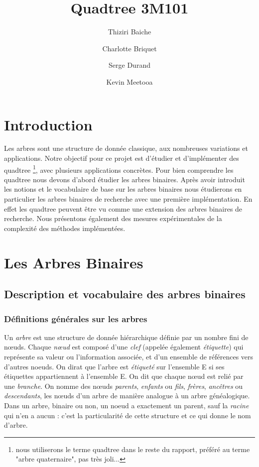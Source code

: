 \documentclass{report}
\title{Quadtree 3M101}
\author{Thiziri Baiche \and Charlotte Briquet \and Serge Durand \and Kevin Meetooa}
\begin{document}
\maketitle
\tableofcontents
\chapter*{Introduction}
Les arbres sont une structure de donnée classique, aux nombreuses variations et applications. Notre objectif pour ce projet est d'étudier et d'implémenter des quadtree \footnote{nous utiliserons le terme quadtree dans le reste du rapport, préféré au terme "arbre quaternaire", pas très joli...}, avec plusieurs applications concrètes. Pour bien comprendre les quadtree nous devons d'abord étudier les arbres binaires. Après avoir introduit les notions et le vocabulaire de base sur les arbres binaires nous étudierons en particulier les arbres binaires de recherche avec une première implémentation. En effet les quadtree peuvent être vu comme une extension des arbres binaires de recherche. Nous présentons également des mesures expérimentales de la complexité des méthodes implémentées.

\chapter{Les Arbres Binaires}
\section{Description et vocabulaire des arbres binaires}
\subsection{Définitions générales sur les arbres}

Un \textit{arbre} est une structure de donnée hiérarchique définie par un nombre fini de nœuds. Chaque \textit{nœud} est composé d'une \textit{clef} (appelée également \textit{étiquette}) qui représente sa valeur ou l'information associée, et d'un ensemble de références vers d'autres noeuds. On dirat que l'arbre est \textit{étiqueté} sur l'ensemble E si ses étiquettes appartiennent à l'ensemble E. On dit que chaque nœud est relié par une \textit{branche}. 
On nomme des nœuds \textit{parents}, \textit{enfants} ou \textit{fils}, \textit{frères}, \textit{ancêtres} ou \textit{descendants}, les nœuds d'un arbre de manière analogue à un arbre généalogique. Dans un arbre, binaire ou non, un noeud a exactement un parent, sauf la \textit{racine} qui n'en a aucun : c'est la particularité de cette structure et ce qui donne le nom d'arbre. 
\end{document}
